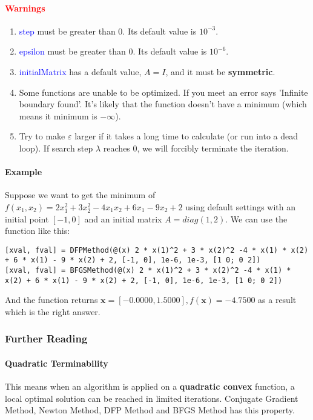 \documentclass{article}
\begin{document}
\paragraph{\textcolor{red}{Warnings}}
\begin{enumerate}
    \item \textcolor{blue}{step} must be greater than $0$. Its default value is $10^{-3}$.
    \item \textcolor{blue}{epsilon} must be greater than $0$. Its default value is $10^{-6}$.
    \item \textcolor{blue}{initialMatrix} has a default value, $A = I$, and it must be \textbf{symmetric}.
    \item Some functions are unable to be optimized. If you meet an error says 'Infinite boundary found'. It's likely that the function doesn't have a minimum (which means it minimum is $-\infty$).
    \item Try to make $\varepsilon$ larger if it takes a long time to calculate (or run into a dead loop). If search step $\lambda$ reaches $0$, we will forcibly terminate the iteration.
\end{enumerate}

\paragraph{Example}
Suppose we want to get the minimum of $f(x_1, x_2) = 2 x_1^2 + 3 x_2^2 - 4 x_1 x_2 + 6 x_1 - 9 x_2 + 2$ using default settings with an initial point $[-1, 0]$ and an initial matrix $A = diag(1, 2)$. We can use the function like this:
\begin{verbatim}
[xval, fval] = DFPMethod(@(x) 2 * x(1)^2 + 3 * x(2)^2 -4 * x(1) * x(2) + 6 * x(1) - 9 * x(2) + 2, [-1, 0], 1e-6, 1e-3, [1 0; 0 2])
[xval, fval] = BFGSMethod(@(x) 2 * x(1)^2 + 3 * x(2)^2 -4 * x(1) * x(2) + 6 * x(1) - 9 * x(2) + 2, [-1, 0], 1e-6, 1e-3, [1 0; 0 2])
\end{verbatim}

And the function returns $\mathbf{x} = [-0.0000, 1.5000], f(\mathbf{x}) = -4.7500$ as a result which is the right answer.

\subsubsection{Further Reading}
\paragraph{Quadratic Terminability} 
This means when an algorithm is applied on a \textbf{quadratic convex} function, a local optimal solution can be reached in limited iterations. Conjugate Gradient Method, Newton Method, DFP Method and BFGS Method has this property.
\end{document}

